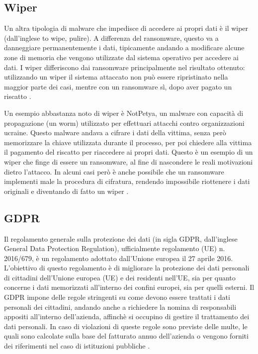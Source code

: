 \documentclass[12pt]{article}
\begin{document}
\subsection{Wiper}

Un altra tipologia di malware che impedisce di accedere ai propri dati è il wiper (dall'inglese to wipe, pulire). A differenza del ransomware, questo va a danneggiare permanentemente i dati, tipicamente andando a modificare alcune zone di memoria che vengono utilizzate dal sistema operativo per accedere ai dati. I wiper differiscono dai ransomware principalmente nel risultato ottenuto: utilizzando un wiper il sistema attaccato non può essere ripristinato nella maggior parte dei casi, mentre con un ransomware sì, dopo aver pagato un riscatto \cite{noauthor_wiper_2022}.

Un esempio abbastanza noto di wiper è NotPetya, un malware con capacità di propagazione (un worm) utilizzato per effettuari attacchi contro organizzazioni ucraine. Questo malware andava a cifrare i dati della vittima, senza però memorizzare la chiave utilizzata durante il processo, per poi chiedere alla vittima il pagamento del riscatto per riaccedere ai propri dati. Questo è un esempio di un wiper che finge di essere un ransomware, al fine di nascondere le reali motivazioni dietro l'attacco. In alcuni casi però è anche possibile che un ransomware implementi male la procedura di cifratura, rendendo impossibile riottenere i dati originali e diventando di fatto un wiper \cite{revay_overview_2022}.

\subsection{GDPR}

Il regolamento generale sulla protezione dei dati (in sigla GDPR, dall’inglese General Data Protection Regulation), ufficialmente regolamento (UE) n. 2016/679, è un regolamento adottato dall’Unione europea il 27 aprile 2016. L’obiettivo di questo regolamento è di migliorare la protezione dei dati personali di cittadini dell’Unione europea (UE) e dei residenti nell’UE, sia per quanto concerne i dati memorizzati all’interno dei confini europei, sia per quelli esterni. Il GDPR impone delle regole stringenti su come devono essere trattati i dati personali dei cittadini, andando anche a richiedere la nomina di responsabili appositi all'interno dell'azienda, affinchè si occupino di gestire il trattamento dei dati personali. In caso di violazioni di queste regole sono previste delle multe, le quali sono calcolate sulla base del fatturato annuo dell'azienda o vengono forniti dei riferimenti nel caso di istituzioni pubbliche \cite{noauthor_regolamento_2022}.
\end{document}
